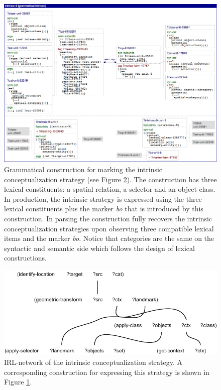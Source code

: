 \begin{figure}
\begin{center}
\includegraphics[width=0.98\columnwidth]{figs/bo-construction.png}
\end{center}
\caption[Example grammatical marker construction]{%
Grammatical construction for marking the intrinsic conceptualization strategy
(see Figure \ref{f:semantic-structure-grammar-intrinsic}). The construction
has three lexical constituents: a spatial relation, a selector and an object class. In production,
the intrinsic strategy is expressed using the three lexical constituents plus the marker \textit{bo}
that is introduced by this construction. In parsing the construction fully recovers
the intrinsic conceptualization strategies upon observing three compatible lexical items 
and the marker \textit{bo}.
Notice that categories are the same on the syntactic and semantic side 
which follows the design of lexical constructions.}
\label{f:bo-construction}
\end{figure}

\begin{figure}
\begin{center}
\includegraphics[width=0.9\columnwidth]{figs/semantic-structure-intrinsic-strategy-grammatical-marking}
\end{center}
\caption[Semantic structure intrinsic conceptualization strategy]{IRL-network of the intrinsic conceptualization strategy. A corresponding construction
for expressing this strategy is shown in Figure \ref{f:bo-construction}.}
\label{f:semantic-structure-grammar-intrinsic}
\end{figure}


